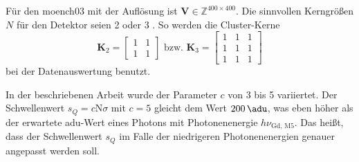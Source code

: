 \noindent
Für den \gls{moench03} mit der Auflösung  ist $\mathbf{V} \in \mathbb{Z}^{400\times 400}$. Die sinnvollen Kerngrößen $N$ für den Detektor seien 2 oder 3 \cite[Abschnitt 4]{cartier_micron_2014}. So werden die Cluster-Kerne
\begin{equation}
    \mathbf{K}_{2} = \begin{bmatrix}
1 & 1\\
1 & 1
\end{bmatrix}
\text{ bzw. }
    \mathbf{K}_{3} = \begin{bmatrix}
1 & 1 & 1\\
1 & 1 & 1\\
1 & 1 & 1
\end{bmatrix}
\end{equation}
bei der Datenauswertung benutzt.

\noindent
In der beschriebenen Arbeit wurde der Parameter $c$ von 3 bis 5 variiertet. Der Schwellenwert $s_Q = c\text{N}\sigma$ mit $c=5$ gleicht dem Wert $\SI{200}{\adu}$, was eben höher als der erwartete \gls{adu}-Wert eines Photons mit Photonenenergie $h\nu_\text{Gd, M5}$. Das heißt, dass der Schwellenwert $s_Q$ im Falle der niedrigeren Photonenenergien genauer angepasst werden soll.